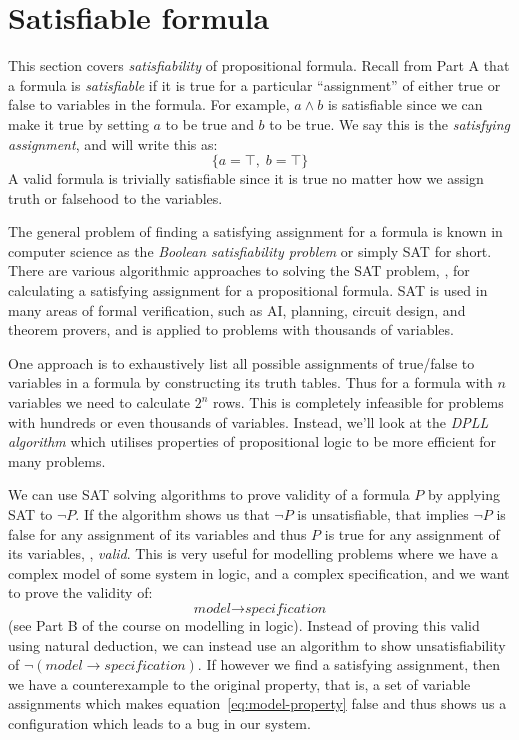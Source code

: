 \newcommand{\subst}[3]{\textit{replace}(#2, #1, #3)}

\section{Satisfiable formula}

This section covers \emph{satisfiability} of propositional
formula. Recall from Part A that a formula is \emph{satisfiable} if it
is true for a particular ``assignment'' of either true or false to
variables in the formula. For example, $a \wedge b$ is satisfiable
since we can make it true by setting $a$ to be true and $b$ to be
true. We say this is the \emph{satisfying assignment}, and will write
this as:
%
\begin{equation*}
\{a = \top, \; b = \top\}
\end{equation*}
%
A valid formula is trivially satisfiable since it is true no matter
how we assign truth or falsehood to the variables.

The general problem of finding a satisfying assignment for a formula
is known in computer science as the \emph{Boolean satisfiability
  problem} or simply SAT for short. There are various
algorithmic approaches to solving the SAT problem, \ie{}, for
calculating a satisfying assignment for a propositional formula.  SAT
is used in many areas of formal verification, such as AI, planning,
circuit design, and theorem provers, and is applied to problems with
thousands of variables.

One approach is to exhaustively list all possible assignments of
true/false to variables in a formula by constructing its truth
tables. Thus for a formula with $n$ variables we need to calculate
$2^n$ rows. This is completely infeasible for problems with hundreds
or even thousands of variables. Instead, we'll look at the \emph{DPLL
  algorithm} which utilises properties of propositional
logic to be more efficient for many problems.

We can use SAT solving algorithms to prove validity of a formula $P$
by applying SAT to $\neg P$. If the algorithm shows us that $\neg P$
is unsatisfiable, that implies $\neg P$ is false for any assignment of
its variables and thus $P$ is true for any assignment of its
variables, \ie{}, \emph{valid}. This is very useful for modelling
problems where we have a complex model of some system in logic, and a
complex specification, and we want to prove the validity of:
\begin{equation}
\textit{model} \rightarrow \textit{specification}
\label{eq:model-property}
\end{equation}
(see Part B of the course on modelling in logic). Instead of proving
this valid using natural deduction, we can instead use an algorithm
to show unsatisfiability of
$\neg (\textit{model} \rightarrow \textit{specification})$. If however
we find a satisfying assignment, then we have a counterexample to the
original property, that is, a set of variable assignments which makes
equation~\eqref{eq:model-property} false and thus shows us
a configuration which leads to a bug in our system.

